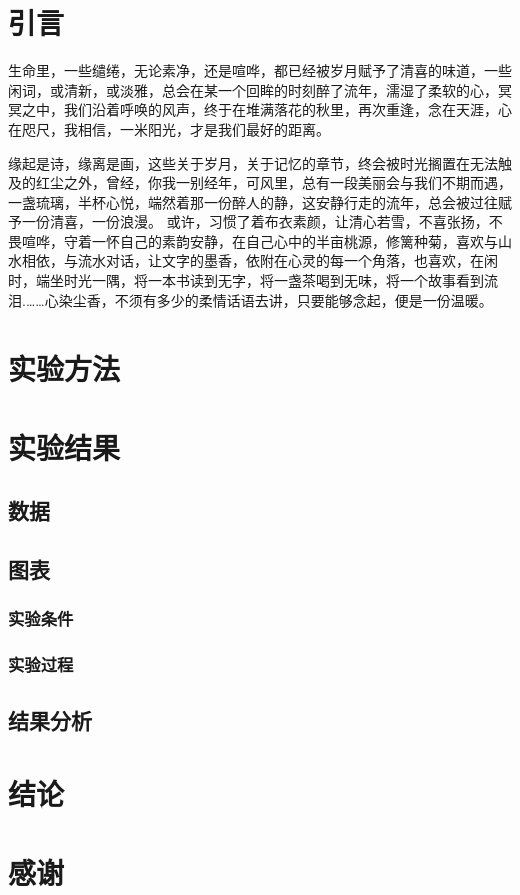\documentclass{ctexart}%
\begin{document}
	\section{引言}
	生命里，一些缱绻，无论素净，还是喧哗，都已经被岁月赋予了清喜的味道，一些闲词，或清新，或淡雅，总会在某一个回眸的时刻醉了流年，濡湿了柔软的心，冥冥之中，我们沿着呼唤的风声，终于在堆满落花的秋里，再次重逢，念在天涯，心在咫尺，我相信，一米阳光，才是我们最好的距离。
	   
	缘起是诗，缘离是画，这些关于岁月，关于记忆的章节，终会被时光搁置在无法触及的红尘之外，曾经，你我一别经年，可风里，总有一段美丽会与我们不期而遇，一盏琉璃，半杯心悦，端然着那一份醉人的静，这安静行走的流年，总会被过往赋予一份清喜，一份浪漫。
	或许，习惯了着布衣素颜，让清心若雪，不喜张扬，不畏喧哗，守着一怀自己的素韵安静，在自己心中的半亩桃源，修篱种菊，喜欢与山水相依，与流水对话，让文字的墨香，依附在心灵的每一个角落，也喜欢，在闲时，端坐时光一隅，将一本书读到无字，将一盏茶喝到无味，将一个故事看到流泪.……心染尘香，不须有多少的柔情话语去讲，只要能够念起，便是一份温暖。
	
	
	\section{实验方法}
	\section{实验结果}
	\subsection{数据}
	\subsection{图表}
	\subsubsection{实验条件}
	\subsubsection{实验过程}
	\subsection{结果分析}
	\section{结论}
	\section{感谢}
\end{document}
